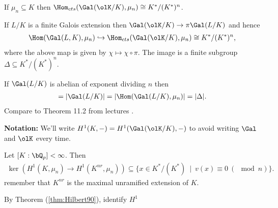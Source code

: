 If $\mu_n \subseteq K$ then $\Hom_{cts}(\Gal(\olK/K),\mu_n)\cong K^*/(K^*)^n$.

If $L/K$ is a finite Galois extension then $\Gal(\olK/K) \to{\pi} \Gal(L/K)$ and hence
\begin{align*}
	\Hom(\Gal(L,K),\mu_n) \hookrightarrow \Hom_{cts}(\Gal(\olK/K),\mu_n) \cong  K^*/(K^*)^n,
\end{align*}
where the above map is given by $\chi \mapsto \chi \circ \pi$. The image is a finite subgroup $\Delta \subseteq K^*/(K^*)^n$. 

If $\Gal(L/K)$ is abelian of exponent dividing $n$ then
\begin{align*}
	[L:K] = |\Gal(L/K)| = |\Hom(\Gal(L/K),\mu_n)| = |\Delta|.
\end{align*}
Compare to Theorem 11.2 from lectures .

\textbf{Notation:} We'll write $H^1(K,-) = H^1(\Gal(\olK/K),-)$ to avoid writing $\Gal$ and $\olK$ every time.

\begin{lem}\label{lem:finite-padic-ext}
	Let $[K:\bQ_p] < \infty$. Then
	\begin{align*}
		\ker(H^1(K,\mu_n) \to H^1(K^{nr},\mu_n)) \subseteq \{x \in K^*/(K^*) ~ \mid~ v(x) \equiv 0 ~ (\mod n)\}.
	\end{align*}
	remember that $K^{nr}$ is the maximal unramified extension of $K$.
\end{lem}
\begin{prf}
	By Theorem (\ref{thm:Hilbert90}), identify $H^1$
\end{prf}

